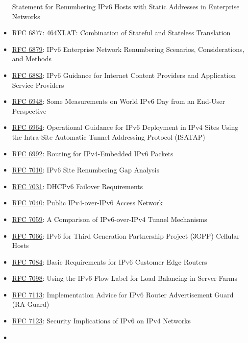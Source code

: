 \documentclass[
]{article}
\begin{document}
\begin{itemize}
  Statement for Renumbering IPv6 Hosts with Static Addresses in
  Enterprise Networks
\item
  \href{https://www.rfc-editor.org/info/rfc6877}{RFC 6877}: 464XLAT:
  Combination of Stateful and Stateless Translation
\item
  \href{https://www.rfc-editor.org/info/rfc6879}{RFC 6879}: IPv6
  Enterprise Network Renumbering Scenarios, Considerations, and Methods
\item
  \href{https://www.rfc-editor.org/info/rfc6883}{RFC 6883}: IPv6
  Guidance for Internet Content Providers and Application Service
  Providers
\item
  \href{https://www.rfc-editor.org/info/rfc6948}{RFC 6948}: Some
  Measurements on World IPv6 Day from an End-User Perspective
\item
  \href{https://www.rfc-editor.org/info/rfc6964}{RFC 6964}: Operational
  Guidance for IPv6 Deployment in IPv4 Sites Using the Intra-Site
  Automatic Tunnel Addressing Protocol (ISATAP)
\item
  \href{https://www.rfc-editor.org/info/rfc6992}{RFC 6992}: Routing for
  IPv4-Embedded IPv6 Packets
\item
  \href{https://www.rfc-editor.org/info/rfc7010}{RFC 7010}: IPv6 Site
  Renumbering Gap Analysis
\item
  \href{https://www.rfc-editor.org/info/rfc7031}{RFC 7031}: DHCPv6
  Failover Requirements
\item
  \href{https://www.rfc-editor.org/info/rfc7040}{RFC 7040}: Public
  IPv4-over-IPv6 Access Network
\item
  \href{https://www.rfc-editor.org/info/rfc7059}{RFC 7059}: A Comparison
  of IPv6-over-IPv4 Tunnel Mechanisms
\item
  \href{https://www.rfc-editor.org/info/rfc7066}{RFC 7066}: IPv6 for
  Third Generation Partnership Project (3GPP) Cellular Hosts
\item
  \href{https://www.rfc-editor.org/info/rfc7084}{RFC 7084}: Basic
  Requirements for IPv6 Customer Edge Routers
\item
  \href{https://www.rfc-editor.org/info/rfc7098}{RFC 7098}: Using the
  IPv6 Flow Label for Load Balancing in Server Farms
\item
  \href{https://www.rfc-editor.org/info/rfc7113}{RFC 7113}:
  Implementation Advice for IPv6 Router Advertisement Guard (RA-Guard)
\item
  \href{https://www.rfc-editor.org/info/rfc7123}{RFC 7123}: Security
  Implications of IPv6 on IPv4 Networks
\item

\end{itemize}
\end{document}
